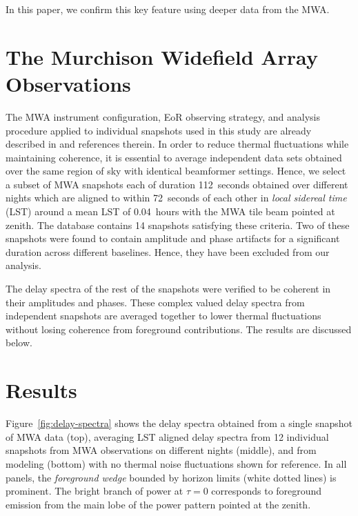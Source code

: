 \documentclass[preprint2,apjl,numberedappendix,twocolappendix,appendixfloats]{emulateapj}
\begin{document}
In this paper, we confirm this key feature using deeper data from the MWA.

\section{The Murchison Widefield Array Observations}\label{sec:MWA}

The MWA instrument configuration, EoR observing strategy, and analysis procedure applied to individual snapshots used in this study are already described in \citet{thy15} and references therein. In order to reduce thermal fluctuations while maintaining coherence, it is essential to average independent data sets obtained over the same region of sky with identical beamformer settings. Hence, we select a subset of MWA snapshots each of duration 112~seconds obtained over different nights which are aligned to within 72~seconds of each other in {\it local sidereal time} (LST) around a mean LST of 0.04~hours with the MWA tile beam pointed at zenith. The database contains 14 snapshots satisfying these criteria. Two of these snapshots were found to contain amplitude and phase artifacts for a significant duration across different baselines. Hence, they have been excluded from our analysis. 

The delay spectra of the rest of the snapshots were verified to be coherent in their amplitudes and phases. These complex valued delay spectra from independent snapshots are averaged together to lower thermal fluctuations without losing coherence from foreground contributions. The results are discussed below.

\section{Results}\label{sec:results}

Figure~\ref{fig:delay-spectra} shows the delay spectra obtained from a single snapshot of MWA data (top), averaging LST aligned delay spectra from 12 individual snapshots from MWA observations on different nights (middle), and from modeling (bottom) with no thermal noise fluctuations \citep{thy15} shown for reference. In all panels, the {\it foreground wedge} bounded by horizon limits (white dotted lines) is prominent. The bright branch of power at $\tau=0$ corresponds to foreground emission from the main lobe of the power pattern pointed at the zenith. 
\end{document}
